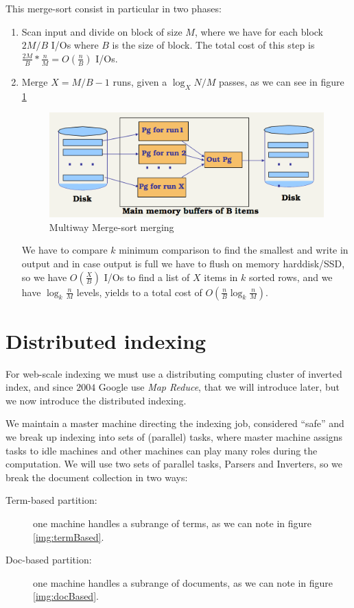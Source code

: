 This merge-sort consist in particular in two phases:
\begin{enumerate}
    \item Scan input and divide on block of size $M$, where we have for each block $2M/B$ I/Os where $B$ 
	  is the size of block.\newline
	  The total cost of this step is $\frac{2M}{B} * \frac{n}{M} = O(\frac{n}{B})$ I/Os.
    \item Merge $X = M/B-1$ runs, given a $\log_X N/M$ passes, as we can see in figure \ref{img:multiWayMerging}

	  \begin{figure}
	      \caption{Multiway Merge-sort merging}
	      \label{img:multiWayMerging}
	      \includegraphics[width=\textwidth]{Images/multiwayMerge}
	  \end{figure}
	  We have to compare $k$ minimum comparison to find the smallest and write in output and in case 
	  output is full we have to flush on memory harddisk/SSD, so we have $O(\frac{X}{B})$ I/Os to find
	  a list of $X$ items in $k$ sorted rows, and we have $\log _k \frac{n}{M}$ levels,
	  yields to a total cost of $O(\frac{n}{B} \log_k \frac{n}{M})$.
\end{enumerate}

\section{Distributed indexing}
For web-scale indexing we must use a distributing computing cluster of inverted index, and since $2004$
Google use \emph{Map Reduce}, that we will introduce later, but we now introduce the distributed indexing.

We maintain a master machine directing the indexing job, considered “safe” and we break up indexing 
into sets of (parallel) tasks, where master machine assigns tasks to idle machines and other machines
can play many roles during the computation.\newline
We will use two sets of parallel tasks, Parsers and Inverters, so we break the document collection in two ways:
\begin{description}
	\item [Term-based partition: ] one machine handles a subrange of terms,
		                       as we can note in figure \ref{img:termBased}.
    \item [Doc-based partition: ] one machine handles a subrange of documents, 
	    			  as we can note in figure \ref{img:docBased}.
\end{description}

